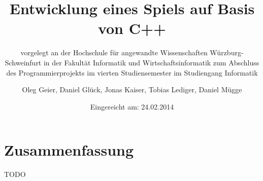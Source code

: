 \documentclass[12pt,oneside,a4paper,parskip]{scrbook}
\def\BaAuthor{Oleg Geier, Daniel Glück, Jonas Kaiser, Tobias Lediger, Daniel Mügge}
\def\BaTitle{Entwicklung eines Spiels auf Basis von C++}
\def\BaSupervisorOne{Prof.\ Dr.\ Peter Braun}
\def\BaSupervisorTwo{Prof.\ Dr.\ XX YY}
\def\BaDeadline{24.02.2014}
\begin{document}


\frontmatter
\titlehead{%
  {Hochschule für angewandte Wissenschaften Würzburg-Schweinfurt\\
   Fakultät Informatik und Wirtschaftsinformatik}}
\subject{Projektdokumentation}
\title{\BaTitle\\[15mm]}
\subtitle{\normalsize{vorgelegt an der Hochschule f\"{u}r angewandte Wissenschaften W\"{u}rzburg-Schweinfurt in der Fakult\"{a}t Informatik und Wirtschaftsinformatik zum Abschluss des Programmierprojekts im vierten Studiensemester im Studiengang Informatik}}
\author{\BaAuthor}
\date{\normalsize{Eingereicht am: \BaDeadline}}
\publishers{
  \normalsize{Erstpr\"{u}fer: \BaSupervisorOne}\\
  \normalsize{Zweitpr\"{u}fer: \BaSupervisorTwo}\\
}


\maketitle



\section*{Zusammenfassung}

TODO

\tableofcontents										



\mainmatter









\backmatter

\listoffigures
{}			

\listoftables


\printbibliography
{}				
\end{document}
